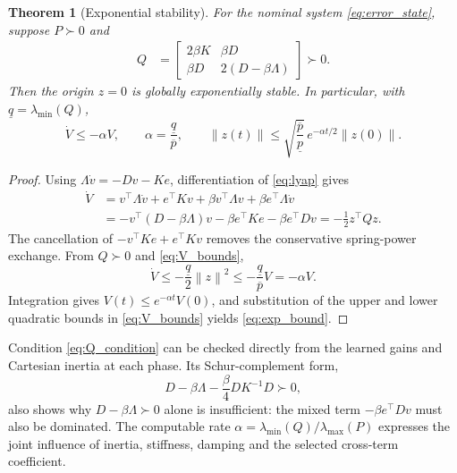 \documentclass[11pt,a4paper]{article}
\newtheorem{theorem}{Theorem}
\newcommand{\norm}[1]{\left\lVert#1\right\rVert}
\begin{document}
\begin{theorem}[Exponential stability]
\label{thm:exp}
For the nominal system \eqref{eq:error_state}, suppose $P\succ0$ and
\begin{equation}
\begin{split}
Q&=
\begin{bmatrix}
2\beta K&\beta D\\
\beta D&2(D-\beta\Lambda)
\end{bmatrix}\succ0 .
\end{split}
\label{eq:Q_condition}
\end{equation}
Then the origin $z=0$ is globally exponentially stable. In particular, with
$\underline q=\lambda_{\min}(Q)$,
\begin{equation}
\dot V\le-\alpha V,\qquad
\alpha=\frac{\underline q}{\overline p},
\qquad
\norm{z(t)}
\le
\sqrt{\frac{\overline p}{\underline p}}\,
e^{-\alpha t/2}\norm{z(0)} .
\label{eq:exp_bound}
\end{equation}
\end{theorem}
\begin{proof}
Using $\Lambda\dot v=-Dv-Ke$, differentiation of \eqref{eq:lyap} gives
\begin{align}
\dot V
&=v^\top\Lambda\dot v+e^\top Kv
  +\beta v^\top\Lambda v+\beta e^\top\Lambda\dot v \nonumber\\
&=-v^\top(D-\beta\Lambda)v-\beta e^\top Ke-\beta e^\top Dv
 =-\tfrac12z^\top Qz .
\label{eq:V_derivative}
\end{align}
The cancellation of $-v^\top Ke+e^\top Kv$ removes the conservative
spring-power exchange. From $Q\succ0$ and \eqref{eq:V_bounds},
\[
\dot V\le-\frac{\underline q}{2}\norm{z}^2
\le-\frac{\underline q}{\overline p}V=-\alpha V.
\]
Integration gives $V(t)\le e^{-\alpha t}V(0)$, and substitution of the upper
and lower quadratic bounds in \eqref{eq:V_bounds} yields
\eqref{eq:exp_bound}.
\end{proof}

Condition \eqref{eq:Q_condition} can be checked directly from the learned gains
and Cartesian inertia at each phase. Its Schur-complement form,
\begin{equation}
D-\beta\Lambda-\frac{\beta}{4}DK^{-1}D\succ0,
\label{eq:Q_schur}
\end{equation}
also shows why $D-\beta\Lambda\succ0$ alone is insufficient: the mixed term
$-\beta e^\top Dv$ must also be dominated. The computable rate
$\alpha=\lambda_{\min}(Q)/\lambda_{\max}(P)$ expresses the joint influence of
inertia, stiffness, damping and the selected cross-term coefficient.
\end{document}
